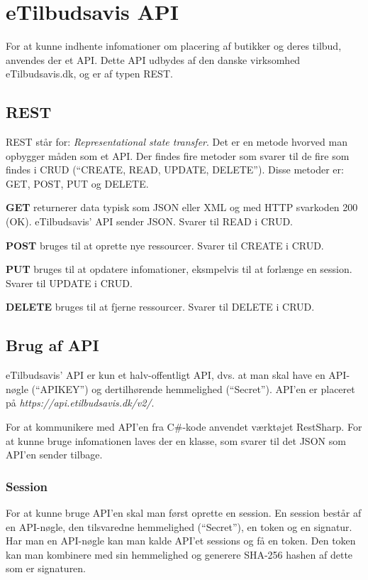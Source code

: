 \section{eTilbudsavis API}\label{api}
For at kunne indhente infomationer om placering af butikker og deres tilbud, anvendes der et API.
Dette API udbydes af den danske virksomhed eTilbudsavis.dk, og er af typen REST.

\subsection{REST}
REST står for: \textit{Representational state transfer}.
Det er en metode hvorved man opbygger måden som et API.
Der findes fire metoder som svarer til de fire som findes i CRUD (``CREATE, READ, UPDATE, DELETE'').
Disse metoder er: GET, POST, PUT og DELETE.

\textbf{GET}
returnerer data typisk som JSON eller XML og med HTTP svarkoden 200 (OK).
eTilbudsavis' API sender JSON.
Svarer til READ i CRUD.

\textbf{POST}
bruges til at oprette nye ressourcer.
Svarer til CREATE i CRUD.

\textbf{PUT}
bruges til at opdatere infomationer, eksmpelvis til at forlænge en session.
Svarer til UPDATE i CRUD.

\textbf{DELETE}
bruges til at fjerne ressourcer.
Svarer til DELETE i CRUD.

\subsection{Brug af API}
eTilbudsavis' API er kun et halv-offentligt API, dvs. at man skal have en API-nøgle (``APIKEY'') og dertilhørende hemmelighed (``Secret'').
API'en er placeret på \textit{https://api.etilbudsavis.dk/v2/}. \citep{eTilAPI}

For at kommunikere med API'en fra C\#-kode anvendet værktøjet RestSharp. \citep{RestSharp}
For at kunne bruge infomationen laves der en klasse, som svarer til det JSON som API'en sender tilbage.

\subsubsection{Session}
For at kunne bruge API'en skal man først oprette en session.
En session består af en API-nøgle, den tilsvaredne hemmelighed (``Secret''), en token og en signatur.
Har man en API-nøgle kan man kalde API'et sessions og få en token.
Den token kan man kombinere med sin hemmelighed og generere SHA-256 hashen af dette som er signaturen.

